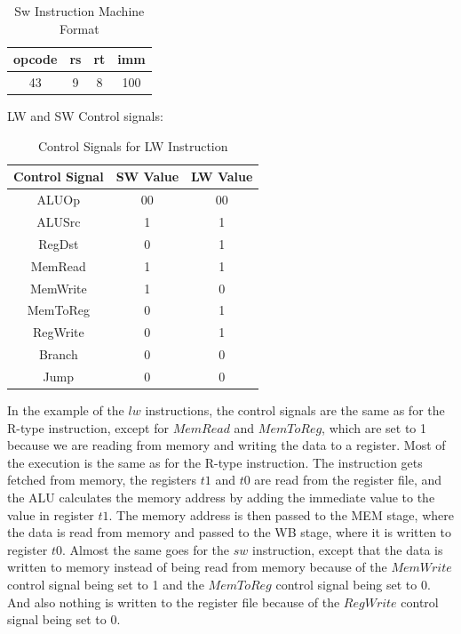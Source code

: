 \begin{table}[H]
    \centering
    \begin{tabular}{|c|c|c|c|}
    \hline
    \textbf{opcode} & \textbf{rs} & \textbf{rt} & \textbf{imm} \\ \hline
    43             & 9          & 8          & 100          \\ \hline
    \end{tabular}
    \caption{Sw Instruction Machine Format}
    \label{tab:sw_instruction}

\end{table}


LW and SW Control signals:
\begin{table}[H]
    \centering
    \begin{tabular}{|c|c|c|}
    \hline
    \textbf{Control Signal} & \textbf{SW Value} & \textbf{LW Value} \\ \hline
    ALUOp                   & 00               & 00               \\ \hline
    ALUSrc                  & 1                & 1                \\ \hline
    RegDst                  & 0                & 1                \\ \hline
    MemRead                 & 1                & 1                \\ \hline
    MemWrite                & 1                & 0                \\ \hline
    MemToReg                & 0                & 1                \\ \hline
    RegWrite                & 0                & 1                \\ \hline
    Branch                  & 0                & 0                \\ \hline
    Jump                 & 0                & 0                \\ \hline
    \end{tabular}
    \caption{Control Signals for LW Instruction}
    \label{tab:lw_control_signals}
\end{table}

In the example of the $lw$ instructions, the control signals are the same as for the R-type instruction, except for $MemRead$ and $MemToReg$, which are set to 1 because we are reading from memory and writing the data to a register. Most of the execution is the same as for the R-type instruction.
The instruction gets fetched from memory, the registers $t1$ and $t0$ are read from the register file, and the ALU calculates the memory address by adding the immediate value to the value in register $t1$. The memory address is then passed to the MEM stage, where the data is read from memory and passed to the WB stage, where it is written to register $t0$.
Almost the same goes for the $sw$ instruction, except that the data is written to memory instead of being read from memory because of the $MemWrite$ control signal being set to 1 and the $MemToReg$ control signal being set to 0. And also nothing is written to the register file because of the $RegWrite$ control signal being set to 0.

